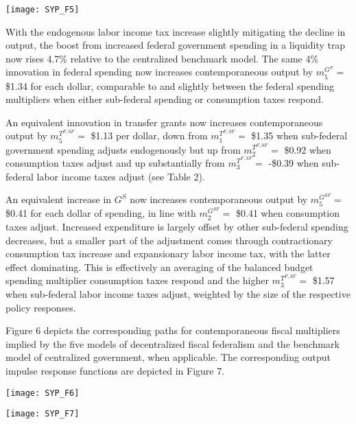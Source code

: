 \documentclass[12pt,letterpaper]{article}
\begin{document}
\begin{center}
\texttt{[image: SYP\_F5]}
\end{center}

With the endogenous labor income tax increase slightly mitigating the decline in output, the boost from increased federal government spending in a liquidity trap now rises 4.7\% relative to the centralized benchmark model. The same 4\% innovation in federal spending now increases contemporaneous output by $m^{G^{F}}_5 = $ \$1.34 for each dollar, comparable to and slightly between the federal spending multipliers when either sub-federal spending or consumption taxes respond. 

An equivalent innovation in transfer grants now increases contemporaneous output by $m^{T^{F,SF}}_5 = $ \$1.13 per dollar, down from $m^{T^{F,SF}}_1 = $ \$1.35 when sub-federal government spending adjusts endogenously but up from $m^{T^{F,SF}}_2 = $ \$0.92 when consumption taxes adjust and up substantially from $m^{T^{F,SF}}_3 = $ -\$0.39 when sub-federal labor income taxes adjust (see Table 2). 

An equivalent increase in $G^S$ now increases contemporaneous output by $m^{G^{SF}}_5 = $ \$0.41 for each dollar of spending, in line with $m^{G^{SF}}_2 = $ \$0.41 when consumption taxes adjust.  Increased expenditure is largely offset by other sub-federal spending decreases, but a smaller part of the adjustment comes through contractionary consumption tax increase and expansionary labor income tax, with the latter effect dominating. This is effectively an averaging of the balanced budget spending multiplier consumption taxes respond and the higher $m^{T^{F,SF}}_3 = $ \$1.57 when sub-federal labor income taxes adjust, weighted by the size of the respective policy responses. 

\bigskip

Figure 6 depicts the corresponding paths for contemporaneous fiscal multipliers implied by the five models of decentralized fiscal federalism and the benchmark model of centralized government, when applicable. The corresponding output impulse response functions are depicted in Figure 7. 

\begin{center}
\texttt{[image: SYP\_F6]}
\end{center}

\begin{center}
\texttt{[image: SYP\_F7]}
\end{center}
\end{document}
